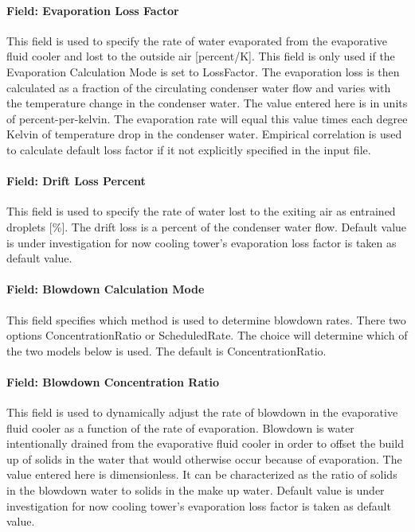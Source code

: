 \paragraph{Field: Evaporation Loss Factor}\label{field-evaporation-loss-factor-5}

This field is used to specify the rate of water evaporated from the evaporative fluid cooler and lost to the outside air {[}percent/K{]}. This field is only used if the Evaporation Calculation Mode is set to LossFactor. The evaporation loss is then calculated as a fraction of the circulating condenser water flow and varies with the temperature change in the condenser water. The value entered here is in units of percent-per-kelvin. The evaporation rate will equal this value times each degree Kelvin of temperature drop in the condenser water. Empirical correlation is used to calculate default loss factor if it not explicitly specified in the input file.

\paragraph{Field: Drift Loss Percent}\label{field-drift-loss-percent-5}

This field is used to specify the rate of water lost to the exiting air as entrained droplets {[}\%{]}. The drift loss is a percent of the condenser water flow. Default value is under investigation for now cooling tower's evaporation loss factor is taken as default value.

\paragraph{Field: Blowdown Calculation Mode}\label{field-blowdown-calculation-mode-5}

This field specifies which method is used to determine blowdown rates. There two options ConcentrationRatio or ScheduledRate. The choice will determine which of the two models below is used. The default is ConcentrationRatio.

\paragraph{Field: Blowdown Concentration Ratio}\label{field-blowdown-concentration-ratio-5}

This field is used to dynamically adjust the rate of blowdown in the evaporative fluid cooler as a function of the rate of evaporation. Blowdown is water intentionally drained from the evaporative fluid cooler in order to offset the build up of solids in the water that would otherwise occur because of evaporation. The value entered here is dimensionless. It can be characterized as the ratio of solids in the blowdown water to solids in the make up water. Default value is under investigation for now cooling tower's evaporation loss factor is taken as default value.


